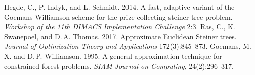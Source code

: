 \documentclass[12pt]{article}
\begin{document}
\begin{thebibliography}{10}
%
%
%
%
%
%
%
%
%
Hegde, C., P. Indyk, and L. Schmidt. 2014. A fast, adaptive variant of the Goemans-Williamson scheme for the prize-collecting steiner tree problem. {\em Workshop of the 11th DIMACS Implementation Challenge} 2:3.
%
Ras, C., K. Swanepoel, and D.\,A. Thomas. 2017. Approximate Euclidean Steiner trees. {\em Journal of Optimization Theory and Applications} 172(3):845--873.
%
Goemans, M.\,X.  and D.\,P. Williamson. 1995. A general approximation technique for constrained forest problems. {\em SIAM Journal on Computing}, 24(2):296--317.
\end{thebibliography}
\makeatletter
\newcommand{\manuallabel}[2]{\def\@currentlabel{#2}\label{#1}}
\makeatother
\manuallabel{alg_general}{1}
\manuallabel{alg_pcst}{2}
\manuallabel{alg_rec_prim}{3}
\manuallabel{alg_rec_pcst}{4}
\end{document}
